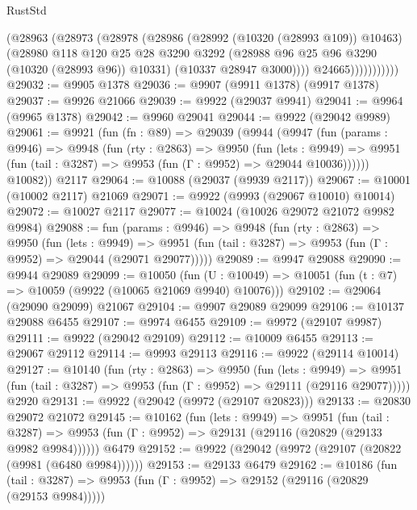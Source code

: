 \begin{lexlean}{RustStd}
\begin{coremodule}
                      (@28963
                        (@28973
                          (@28978
                            (@28986
                              (@28992 (@10320 (@28993 @109)) @10463)
                              (@28980
                                @118
                                @120
                                @25
                                @28
                                @3290
                                @3292
                                (@28988 @96 @25 @96 @3290 (@10320 (@28993 @96)) @10331)
                                (@10337 @28947 @3000))))
                          @24665)))))))))))
@29032 := @9905 @1378
@29036 := @9907 (@9911 @1378) (@9917 @1378)
@29037 := @9926 @21066
@29039 := @9922 (@29037 @9941)
@29041 := @9964 (@9965 @1378)
@29042 := @9960 @29041
@29044 := @9922 (@29042 @9989)
@29061 := @9921
    (fun (fn : @89) =>
    @29039
      (@9944
        (@9947
          (fun (params : @9946) =>
          @9948
            (fun (rty : @2863) =>
            @9950
              (fun (lets : @9949) =>
              @9951 (fun (tail : @3287) => @9953 (fun (Γ : @9952) => @29044 @10036))))))
        @10082))
    @2117
@29064 := @10088 (@29037 (@9939 @2117))
@29067 := @10001 (@10002 @2117) @21069
@29071 := @9922 (@9993 (@29067 @10010) @10014)
@29072 := @10027 @2117
@29077 := @10024 (@10026 @29072 @21072 @9982 @9984)
@29088 := fun (params : @9946) =>
  @9948
    (fun (rty : @2863) =>
    @9950
      (fun (lets : @9949) =>
      @9951 (fun (tail : @3287) => @9953 (fun (Γ : @9952) => @29044 (@29071 @29077)))))
@29089 := @9947 @29088
@29090 := @9944 @29089
@29099 := @10050
    (fun (U : @10049) => @10051 (fun (t : @7) => @10059 (@9922 (@10065 @21069 @9940) @10076)))
@29102 := @29064 (@29090 @29099) @21067
@29104 := @9907 @29089 @29099
@29106 := @10137 @29088 @6455
@29107 := @9974 @6455
@29109 := @9972 (@29107 @9987)
@29111 := @9922 (@29042 @29109)
@29112 := @10009 @6455
@29113 := @29067 @29112
@29114 := @9993 @29113
@29116 := @9922 (@29114 @10014)
@29127 := @10140
    (fun (rty : @2863) =>
    @9950
      (fun (lets : @9949) =>
      @9951 (fun (tail : @3287) => @9953 (fun (Γ : @9952) => @29111 (@29116 @29077)))))
    @2920
@29131 := @9922 (@29042 (@9972 (@29107 @20823)))
@29133 := @20830 @29072 @21072
@29145 := @10162
    (fun (lets : @9949) =>
    @9951
      (fun (tail : @3287) =>
      @9953 (fun (Γ : @9952) => @29131 (@29116 (@20829 (@29133 @9982 @9984))))))
    @6479
@29152 := @9922 (@29042 (@9972 (@29107 (@20822 (@9981 (@6480 @9984))))))
@29153 := @29133 @6479
@29162 := @10186
    (fun (tail : @3287) => @9953 (fun (Γ : @9952) => @29152 (@29116 (@20829 (@29153 @9984)))))

\end{coremodule}
\end{lexlean}
